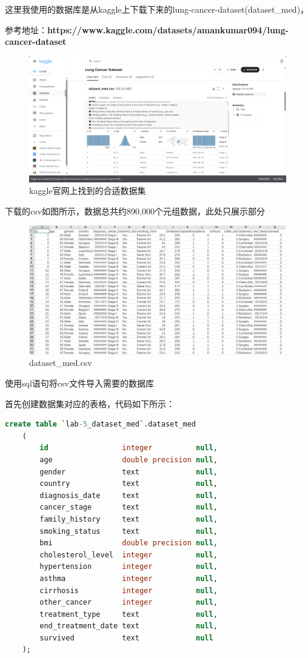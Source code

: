 \documentclass{article}
\begin{document}
	这里我使用的数据库是从kaggle上下载下来的lung-cancer-dataset(dataset\_med)，
	
	参考地址：\textbf{https://www.kaggle.com/datasets/amankumar094/lung-cancer-dataset}
	
	\begin{figure}[H]
		\centering
		\includegraphics[width=15cm]{./images/6.kaggle官网上找到的合适数据集.png}
		\caption{kaggle官网上找到的合适数据集}
	\end{figure}
	
	下载的csv如图所示，数据总共约890,000个元组数据，此处只展示部分
	
	\begin{figure}[H]
		\centering
		\includegraphics[width=15cm]{./images/7.dataset_med.png}
		\caption{dataset\_med.csv}
	\end{figure}
	
	使用sql语句将csv文件导入需要的数据库
	
	首先创建数据集对应的表格，代码如下所示：
	
	\begin{lstlisting}[language=sql, title=使用sql语句将csv文件导入需要的数据库, tabsize=4]
	create table `lab-5_dataset_med`.dataset_med
	(
		id                 integer          null,
		age                double precision null,
		gender             text             null,
		country            text             null,
		diagnosis_date     text             null,
		cancer_stage       text             null,
		family_history     text             null,
		smoking_status     text             null,
		bmi                double precision null,
		cholesterol_level  integer          null,
		hypertension       integer          null,
		asthma             integer          null,
		cirrhosis          integer          null,
		other_cancer       integer          null,
		treatment_type     text             null,
		end_treatment_date text             null,
		survived           text             null
	);
	\end{lstlisting}
	
\end{document}
